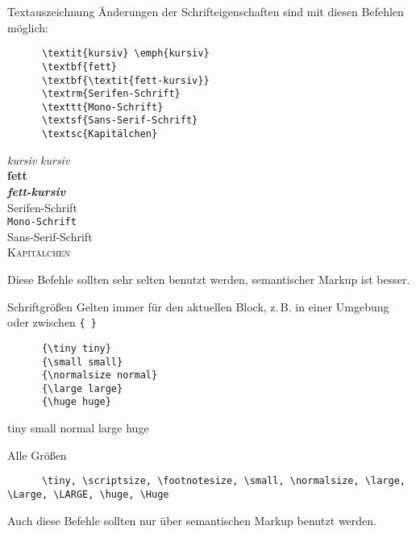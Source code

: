 \begin{frame}[fragile]{Textauszeichnung}
  Änderungen der Schrifteigenschaften sind mit diesen Befehlen möglich:
  \begin{CodeExample}{0.60}
    \begin{lstlisting}
      \textit{kursiv} \emph{kursiv}
      \textbf{fett}
      \textbf{\textit{fett-kursiv}}
      \textrm{Serifen-Schrift}
      \texttt{Mono-Schrift}
      \textsf{Sans-Serif-Schrift}
      \textsc{Kapitälchen}
    \end{lstlisting}
  \CodeResult
    \strut
    \textit{kursiv} \emph{kursiv} \\
    \textbf{fett} \\
    \textbf{\textit{fett-kursiv}} \\
    \textrm{Serifen-Schrift} \\
    \texttt{Mono-Schrift} \\
    \textsf{Sans-Serif-Schrift} \\
    \textsc{Kapitälchen}
  \end{CodeExample}

  \vspace{1em}
  Diese Befehle sollten sehr selten benutzt werden, semantischer Markup ist besser.
\end{frame}

\begin{frame}[fragile]{Schriftgrößen}
  Gelten immer für den aktuellen Block, z.\,B. in einer Umgebung oder zwischen \lstinline+{ }+
  \begin{CodeExample}{0.48}
    \begin{lstlisting}
      {\tiny tiny}
      {\small small}
      {\normalsize normal}
      {\large large}
      {\huge huge}
    \end{lstlisting}
  \CodeResult
    \begin{minipage}[c][5\baselineskip][c]{\textwidth}
      {\tiny tiny}
      {\small small}
      {\normalsize normal}
      {\large large}
      {\huge huge}
    \end{minipage}
  \end{CodeExample}
  \vspace{1em}
  \begin{block}{Alle Größen}
    \begin{lstlisting}
      \tiny, \scriptsize, \footnotesize, \small, \normalsize, \large, \Large, \LARGE, \huge, \Huge
    \end{lstlisting}
  \end{block}
  Auch diese Befehle sollten nur über semantischen Markup benutzt werden.
\end{frame}

